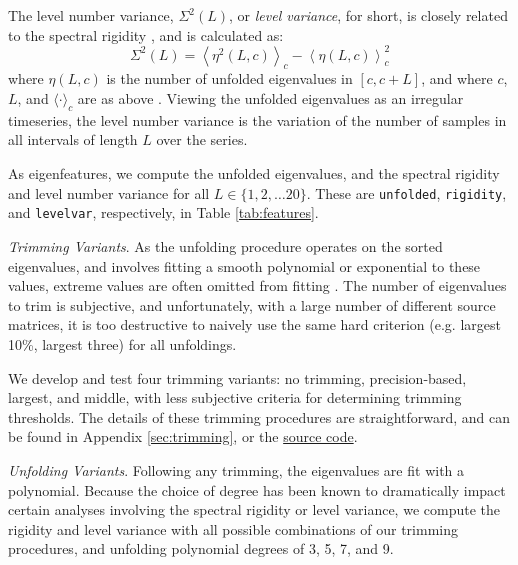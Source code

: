 \documentclass[12pt]{spieman}  %
\newcommand{\code}[1]{\small\texttt{#1}\normalsize}
\begin{document}
\begin{spacing}{2}
The level number variance, \(\Sigma^2(L)\), or \textit{level variance}, for short, is
closely related to the spectral rigidity \cite{mehtaRandomMatrices2004}, and is
calculated as:
\begin{equation}
\label{eq:levlvar}
\Sigma^2(L) = \left\langle \eta^2(L, c) \right\rangle_c - \left\langle \eta(L, c) \right\rangle^2_c
\end{equation}
where \(\eta(L, c)\) is the number of unfolded eigenvalues in \([c, c+ L]\),
and where \(c\), \(L\), and \(\langle \cdot \rangle_c\) are as above
\cite{guhrRandommatrixTheoriesQuantum1998a}. Viewing the unfolded eigenvalues
as an irregular timeseries, the level number variance is the
variation of the number of samples in all intervals of length \(L\) over the
series.

As eigenfeatures, we compute the unfolded eigenvalues, and the spectral
rigidity and level number variance for all \(L \in \{ 1, 2, \dots 20 \}\).
These are \code{unfolded}, \code{rigidity}, and \code{levelvar}, respectively,
in Table \ref{tab:features}.


\textit{Trimming Variants}. As the unfolding procedure operates on the sorted
eigenvalues, and involves fitting a smooth polynomial or exponential to these
values, extreme values are often omitted from fitting
\cite{moralesImprovedUnfoldingDetrending2011,
abueleninEffectUnfoldingSpectral2012}. The number of eigenvalues to trim is
subjective, and unfortunately, with a large number of different source
matrices, it is too destructive to naively use the same hard criterion (e.g.
largest 10\%, largest three) for all unfoldings.

We develop and test four trimming variants: no trimming, precision-based,
largest, and middle, with less subjective criteria for determining trimming
thresholds. The details of these trimming procedures are straightforward, and
can be found in Appendix \ref{sec:trimming}, or the
\href{https://github.com/DM-Berger/random-matrix-fmri/blob/7c9e4187f582dedee728cd7193b8894d928c2f00/code/rmt/updated_dataset.py#L431-L444}{source
code}.

\textit{Unfolding Variants}. Following any trimming, the eigenvalues are fit
with a polynomial. Because the choice of degree has been known to dramatically
impact certain analyses involving the spectral rigidity or level
variance\cite{abul-magdUnfoldingSpectrumChaotic2014,
moralesImprovedUnfoldingDetrending2011, abueleninSpectralUnfoldingChaotic2018,
fossionRandommatrixSpectraTime2013, abueleninEffectUnfoldingSpectral2012}, we
compute the rigidity and level variance with all possible combinations of our
trimming procedures, and unfolding polynomial degrees of 3, 5, 7, and 9.


\end{spacing}
\end{document}
